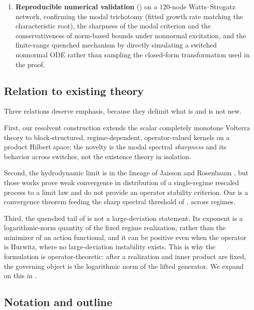 \documentclass[11pt]{article}
\theoremstyle{plain}
\theoremstyle{definition}
\theoremstyle{remark}
\begin{document}
\begin{enumerate}[leftmargin=1.4em,itemsep=4pt]
\item \textbf{Reproducible numerical validation} () on a $120$-node
Watts--Strogatz network, confirming the modal trichotomy (fitted growth rate matching the
characteristic root), the sharpness of the modal criterion and the conservativeness of norm-based
bounds under nonnormal excitation, and the finite-range quenched mechanism by directly simulating a switched nonnormal ODE rather
than sampling the closed-form transformation used in the proof.
\end{enumerate}

\subsection{Relation to existing theory}

Three relations deserve emphasis, because they delimit what is and is not new.

First, our resolvent construction extends the scalar completely monotone Volterra theory
\cite{pruss1993evolution,bazhlekova2001fractional} to block-structured, regime-dependent,
operator-valued kernels on a product Hilbert space; the novelty is the modal spectral
\emph{sharpness}  and its behavior across switches, not the existence theory in
isolation.

Second, the hydrodynamic limit is in the lineage of Jaisson and Rosenbaum
\cite{jaisson2015,jaisson2016}, but those works prove weak convergence in distribution of a
single-regime rescaled process to a limit law and do not provide an operator stability criterion.
Our  is a convergence theorem feeding the sharp spectral threshold of
, across regimes.

Third, the quenched tail of  is not a large-deviation statement. Its exponent
is a logarithmic-norm quantity of the fixed regime realization, rather than the minimizer of an
action functional, and it can be positive even when the operator is Hurwitz, where no
large-deviation instability exists. This is why the formulation is operator-theoretic: after a
realization and inner product are fixed, the governing object is the logarithmic norm of the
lifted generator. We expand on this in .

\subsection{Notation and outline}
\end{document}
